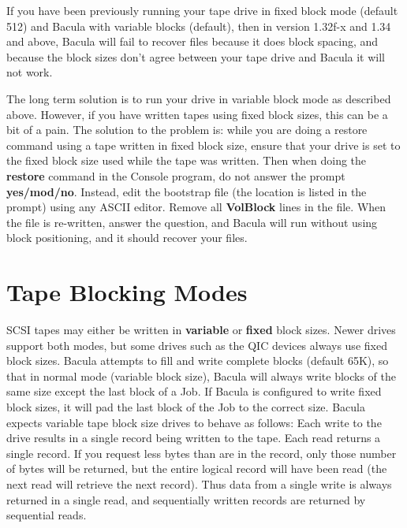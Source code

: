 If you have been previously running your tape drive in fixed block mode
(default 512) and Bacula with variable blocks (default), then in version
1.32f-x and 1.34 and above, Bacula will fail to recover files because it does
block spacing, and because the block sizes don't agree between your tape drive
and Bacula it will not work.

The long term solution is to run your drive in variable block mode as
described above. However, if you have written tapes using fixed block sizes,
this can be a bit of a pain. The solution to the problem is: while you are
doing a restore command using a tape written in fixed block size, ensure that
your drive is set to the fixed block size used while the tape was written.
Then when doing the {\bf restore} command in the Console program, do not
answer the prompt {\bf yes/mod/no}. Instead, edit the bootstrap file (the
location is listed in the prompt) using any ASCII editor. Remove all {\bf
VolBlock} lines in the file. When the file is re-written, answer the question,
and Bacula will run without using block positioning, and it should recover
your files.

\label{BlockModes}
\section{Tape Blocking Modes}

SCSI tapes may either be written in {\bf variable} or {\bf fixed} block sizes.
Newer drives support both modes, but some drives such as the QIC devices
always use fixed block sizes. Bacula attempts to fill and write complete
blocks (default 65K), so that in normal mode (variable block size), Bacula
will always write blocks of the same size except the last block of a Job. If
Bacula is configured to write fixed block sizes, it will pad the last block of
the Job to the correct size. Bacula expects variable tape block size drives to
behave as follows: Each write to the drive results in a single record being
written to the tape. Each read returns a single record. If you request less
bytes than are in the record, only those number of bytes will be returned, but
the entire logical record will have been read (the next read will retrieve the
next record). Thus data from a single write is always returned in a single
read, and sequentially written records are returned by sequential reads.

